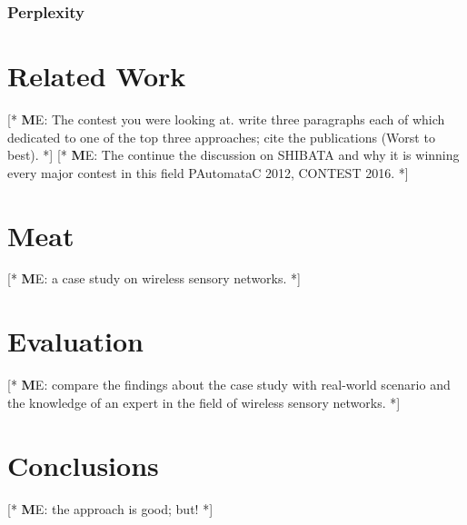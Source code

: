 \documentclass[
a4paper,     %
12pt         %
]{scrartcl}  %
\newcommand\me[1]{ [* {\textbf ME:} #1 *]}
\begin{document}
\subsubsection{Perplexity}
\newpage
\section{Related Work}
\me{The contest you were looking at. write three paragraphs each of which dedicated to one of the top three approaches; cite the publications (Worst to best).}
\me{The continue the discussion on SHIBATA and why it is winning every major contest in this field  PAutomataC 2012, CONTEST 2016.}

\section{Meat}
\me {a case study on wireless sensory networks.}



\newpage
\section{Evaluation}
\me {compare the findings about the case study with real-world scenario and the knowledge of an expert in the field of wireless sensory networks.}



\newpage
\section{Conclusions}
\me{the approach is good; but!}

\appendix  %

 

 
\end{document}
